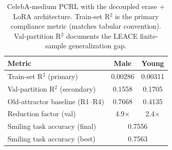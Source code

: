 \begin{table}[t]
  \centering
  \caption{CelebA-medium PCRL with the decoupled erase + LoRA architecture.
  Train-set R$^2$ is the primary compliance metric (matches tabular convention).
  Val-partition R$^2$ documents the LEACE finite-sample generalization gap.}
  \label{tab:celeba-final}
  \begin{tabular}{lcc}
    \toprule
    Metric & Male & Young \\
    \midrule
    Train-set R$^2$ (primary) & 0.00286 & 0.00311 \\
    Val-partition R$^2$ (secondary) & 0.1558 & 0.1705 \\
    Old-attractor baseline (R1--R4) & 0.7668 & 0.4135 \\
    Reduction factor (val) & 4.9$\times$ & 2.4$\times$ \\
    \midrule
    Smiling task accuracy (final) & \multicolumn{2}{c}{0.7556} \\
    Smiling task accuracy (best) & \multicolumn{2}{c}{0.7563} \\
    \bottomrule
  \end{tabular}
\end{table}
